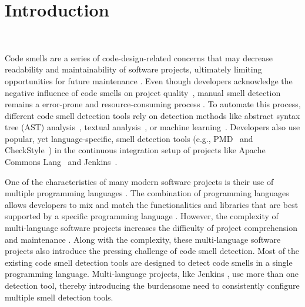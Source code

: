 \section{Introduction}~\label{sec:introduction}

\vspace*{-1em}


Code smells are a series of code-design-related concerns that may decrease
readability \cite{5741260,SANTOS2018450} and maintainability
\cite{6392174,6405287} of software projects, ultimately limiting opportunities
for future maintenance \cite{Fowler_Beck}. Even though developers acknowledge
the negative influence of code smells on project quality~\cite{developersCare},
manual smell detection remains a error-prone and resource-consuming process
\cite{DetectingDefectsInObject}. To automate this process, different code smell
detection tools rely on detection methods like abstract syntax tree (AST)
analysis~\cite{Lenarduzzi2023}, textual analysis~\cite{Palomba}, or machine
learning~\cite{ML}. Developers also use popular, yet language-specific, smell
detection tools (e.g., PMD~\cite{PMD} and CheckStyle~\cite{CheckStyle}) in the
continuous integration setup of projects like Apache Commons
Lang~\cite{ApacheCommonsLang} and Jenkins~\cite{Jekins}.


One of the characteristics of many modern software projects is their use of
multiple programming languages \cite{723183}. The combination of programming
languages allows developers to mix and match the functionalities and libraries
that are best supported by a specific programming language \cite{7476675}.
However, the complexity of multi-language software projects increases the
difficulty of project comprehension and maintenance \cite{7476675,
10.1109/SCAM.2012.11, 7396422}. Along with the complexity, these multi-language
software projects also introduce the pressing challenge of code smell detection.
Most of the existing code smell detection tools are designed to detect code
smells in a single programming language. Multi-language projects, like Jenkins
\cite{Jekins}, use more than one detection tool, thereby introducing the
burdensome need to consistently configure multiple smell detection tools.

